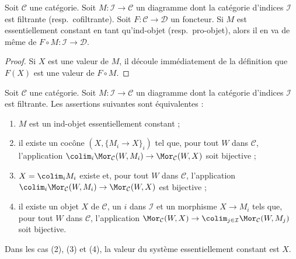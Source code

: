 \begin{lemma}
\label{lemma-image-essentially-constant}
Soit $\mathcal{C}$ une catégorie. Soit $M : \mathcal{I} \to \mathcal{C}$
un diagramme dont la catégorie d'indices $\mathcal{I}$ est filtrante
(resp.\ cofiltrante). Soit $F : \mathcal{C} \to \mathcal{D}$ un foncteur.
Si $M$ est essentiellement constant en tant qu'ind-objet (resp.\ pro-objet),
alors il en va de même de $F \circ M : \mathcal{I} \to \mathcal{D}$.
\end{lemma}

\begin{proof}
Si $X$ est une valeur de $M$, il découle immédiatement de la définition que
$F(X)$ est une valeur de $F \circ M$.
\end{proof}

\begin{lemma}
\label{lemma-characterize-essentially-constant-ind}
Soit $\mathcal{C}$ une catégorie. Soit $M : \mathcal{I} \to \mathcal{C}$
un diagramme dont la catégorie d'indices $\mathcal{I}$ est filtrante.
Les assertions suivantes sont équivalentes :
\begin{enumerate}
\item $M$ est un ind-objet essentiellement constant ;
\item il existe un cocône $(X, \{M_i \to X\}_i)$ tel que, pour tout $W$ dans
$\mathcal{C}$, l'application
$\colim_i \Mor_\mathcal{C}(W, M_i) \to \Mor_\mathcal{C}(W, X)$
soit bijective ;
\item $X = \colim_i M_i$ existe et, pour tout $W$ dans $\mathcal{C}$,
l'application
$\colim_i \Mor_\mathcal{C}(W, M_i) \to \Mor_\mathcal{C}(W, X)$
est bijective ;
\item il existe un objet $X$ de $\mathcal{C}$, un $i$ dans $\mathcal{I}$ et un
morphisme $X \to M_i$ tels que, pour tout $W$ dans $\mathcal{C}$, l'application
$\Mor_\mathcal{C}(W, X) \to
\colim_{j \in \mathcal{I}} \Mor_\mathcal{C}(W, M_j)$
soit bijective.
\end{enumerate}
Dans les cas (2), (3) et (4), la valeur du système essentiellement constant
est $X$.
\end{lemma}

